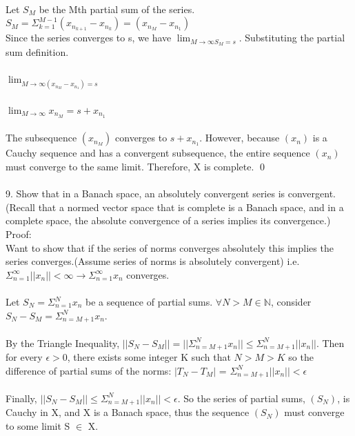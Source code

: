 \documentclass{article}
\begin{document}
\\
Let $S_M$ be the Mth partial sum of the series. \\
$S_M = \Sigma_{k=1}^{M-1} (x_{n_{k+1}} - x_{n_k}) = (x_{n_M} -x_{n_1}) $
\\
Since the series converges to s, we have $\lim_{M\to\infty S_M = s}$. Substituting the partial sum definition. 
\\
\\
$\lim_{M\to\infty (x_{n_M} -x_{n_1}) = s} $ 
\\
\\
$\lim_{M\to\infty} x_{n_M} = s + x_{n_1} $
\\
\\
The subsequence $(x_{n_M})$ converges to $s + x_{n_1}$. However, because $(x_n)$ is a Cauchy sequence and has a convergent subsequence, the entire sequence $(x_n)$ must converge to the same limit. Therefore, X is complete. \qed
\\
\\
9. Show that in a Banach space, an absolutely convergent series is convergent.
\\
(Recall that a normed vector space that is complete is a Banach space, and in a complete space, the absolute convergence of a series implies its convergence.)
\\
Proof: 
\\
Want to show that if the series of norms converges absolutely this implies the series converges.(Assume series of norms is absolutely convergent) i.e.
\\
$\Sigma_{n=1}^\infty ||x_n|| < \infty \to \Sigma_{n=1}^\infty x_n$ converges. 
\\
\\
Let $S_N = \Sigma_{n=1}^N x_n$ be a sequence of partial sums. $\forall N > M \in \mathbb{N}$, consider $S_N - S_M = \Sigma_{n=M+1}^N x_n$.
\\
\\
By the Triangle Inequality,  $||S_N - S_M|| = ||\Sigma_{n=M+1}^N x_n|| \leq \Sigma_{n=M+1}^N ||x_n|| $.
Then for every $\epsilon > 0$, there exists some integer K such that $N > M > K $ so the difference of partial sums of the norms: $|T_N - T_M| $ = $ \Sigma_{n=M+1}^N ||x_n|| < \epsilon$
\\
\\
Finally, $||S_N - S_M|| \leq \Sigma_{n=M+1}^N ||x_n|| < \epsilon$. So the series of partial sums, $(S_N)$, is Cauchy in X, and X is a Banach space, thus the sequence $(S_N)$ must converge to some limit S $\in$ X.
\\
\end{document}
